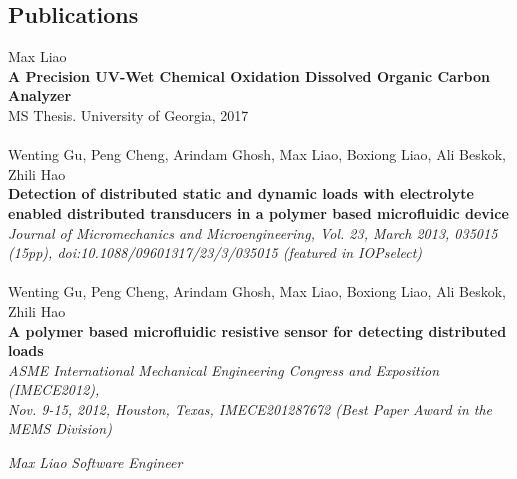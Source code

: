 \documentclass[]{resume}
\begin{document}
\begin{body}
	\section{Publications}
    	Max Liao\\ \textbf{A Precision UV-Wet Chemical Oxidation Dissolved Organic Carbon Analyzer}\\
    	MS Thesis. University of Georgia, 2017
    	\\\\
    	Wenting Gu, Peng Cheng, Arindam Ghosh, Max Liao, Boxiong Liao, Ali Beskok, Zhili Hao\\
    	\textbf{Detection of distributed static and dynamic loads with electrolyte enabled distributed transducers in a polymer based microfluidic device}\\
    	\emph{ Journal of Micromechanics and Microengineering, Vol. 23, March 2013, 035015 (15pp), doi:10.1088/09601317/23/3/035015 (featured in IOPselect) }
    	\\\\
    	Wenting Gu, Peng Cheng, Arindam Ghosh, Max Liao, Boxiong Liao, Ali Beskok, Zhili Hao\\
    	\textbf{A polymer based microfluidic resistive sensor for detecting distributed loads}\\
    	\emph{ ASME International Mechanical Engineering Congress and Exposition (IMECE2012), \\ Nov. 9-15, 2012, Houston, Texas, IMECE201287672 (Best Paper Award in the MEMS Division) }
    	\\
    	\begin{flushleft}
    	\end{flushleft}
    	\begin{flushright}
    		\emph{Max Liao }
    		\emph{ Software Engineer}
    	\end{flushright}

\end{body}
\end{document}
